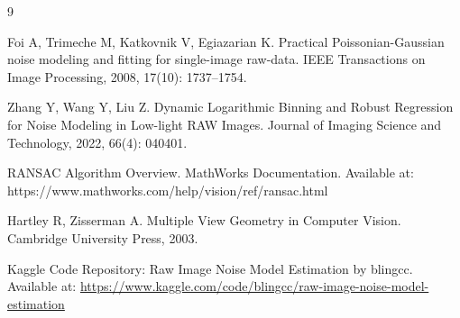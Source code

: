 \documentclass[a4paper]{article}
\begin{document}
\begin{thebibliography}{9}

 Foi A, Trimeche M, Katkovnik V, Egiazarian K. Practical Poissonian-Gaussian noise modeling and fitting for single-image raw-data. IEEE Transactions on Image Processing, 2008, 17(10): 1737–1754.

 Zhang Y, Wang Y, Liu Z. Dynamic Logarithmic Binning and Robust Regression for Noise Modeling in Low-light RAW Images. Journal of Imaging Science and Technology, 2022, 66(4): 040401.

 RANSAC Algorithm Overview. MathWorks Documentation. Available at: https://www.mathworks.com/help/vision/ref/ransac.html

 Hartley R, Zisserman A. Multiple View Geometry in Computer Vision. Cambridge University Press, 2003.

 Kaggle Code Repository: Raw Image Noise Model Estimation by blingcc. Available at: \url{https://www.kaggle.com/code/blingcc/raw-image-noise-model-estimation}

\end{thebibliography}
\end{document}
